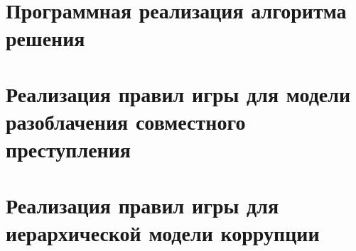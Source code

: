 \chapter{Программная реализация алгоритма решения}

\chapter{Реализация правил игры для модели разоблачения совместного преступления}

\chapter{Реализация правил игры для иерархической модели коррупции}
